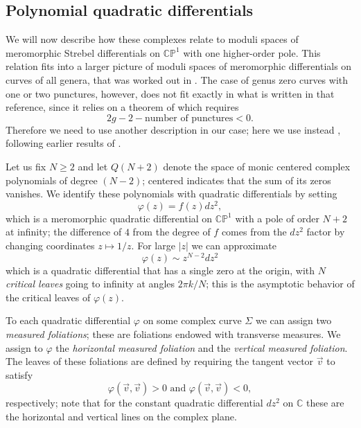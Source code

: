 \documentclass[11pt,a4paper]{amsart}
\theoremstyle{definition}
\begin{document}
\subsection{Polynomial quadratic differentials}
We will now describe how these complexes relate to moduli spaces of meromorphic Strebel differentials on $\mathbb{CP}^1$ with one higher-order pole. This relation fits into a larger picture of moduli spaces of meromorphic differentials on curves of all genera, that was worked out in \cite{kontsevich2025pre}. The case of genus zero curves with one or two punctures, however, does not fit exactly in what is written in that reference, since it relies on a theorem of \cite{gupta2019meromorphic} which requires
\[ 2g-2-\text{number of punctures} <0. \]
Therefore we need to use another description in our case; here we use instead \cite{dias2021quadratic}, following earlier results of \cite{au2006prescribed}.

\noindent Let us fix $N \ge 2$ and let $Q(N+2)$ denote the space of monic centered complex polynomials of degree $(N-2)$; centered indicates that the sum of its zeros vanishes. We identify these polynomials with quadratic differentials by setting
\[ \varphi(z) = f(z) dz^2, \]
which is a meromorphic quadratic differential on $\mathbb{CP}^1$ with a pole of order $N+2$ at infinity; the difference of $4$ from the degree of $f$ comes from the $dz^2$ factor by changing coordinates $z \mapsto 1/z$. For large $|z|$ we can approximate
\[ \varphi(z) \sim z^{N-2} dz^2 \]
which is a quadratic differential that has a single zero at the origin, with $N$ \emph{critical leaves} going to infinity at angles $2\pi k/N$; this is the asymptotic behavior of the critical leaves of $\varphi(z)$.

To each quadratic differential $\varphi$ on some complex curve $\Sigma$ we can assign two \emph{measured foliations}; these are foliations endowed with transverse measures. We assign to $\varphi$ the \emph{horizontal measured foliation} and the \emph{vertical measured foliation}. The leaves of these foliations are defined by requiring the tangent vector $\vec{v}$ to satisfy
\[ \varphi(\vec{v},\vec{v}) > 0 \text{\ and\ } \varphi(\vec{v},\vec{v}) < 0,\]
respectively; note that for the constant quadratic differential $dz^2$ on $\mathbb{C}$ these are the horizontal and vertical lines on the complex plane. 
\end{document}
